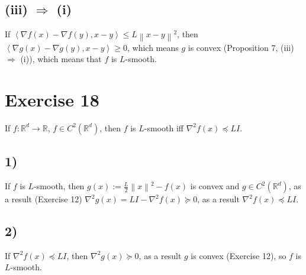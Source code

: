 \documentclass[11pt,a4paper]{article}
\newcommand{\R}{\mathbb{R}}
\newcommand{\norm}[1]{\left\| #1 \right\|}
\newcommand{\ip}[2]{\left\langle #1, #2 \right\rangle}
\begin{document}
\subsection*{(iii) $\Rightarrow$ (i)}
If $\ip{\nabla f(x) - \nabla f(y)}{x-y} \le L\norm{x-y}^2$, then
$\ip{\nabla g(x) - \nabla g(y)}{x-y} \ge 0$, which means $g$ is convex
(Proposition 7, (iii) $\Rightarrow$ (i)), which means that $f$ is $L$-smooth.

\section*{Exercise 18}

If $f : \R^d \to \R$, $f \in C^2(\R^d)$, then $f$ is $L$-smooth iff $\nabla^2 f(x) \preceq LI$.

\subsection*{1)}
If $f$ is $L$-smooth, then $g(x) := \frac{L}{2}\norm{x}^2 - f(x)$ is convex and
$g \in C^2(\R^d)$, as a result (Exercise 12) $\nabla^2 g(x) = LI - \nabla^2 f(x) \succeq 0$,
as a result $\nabla^2 f(x) \preceq LI$.

\subsection*{2)}
If $\nabla^2 f(x) \preceq LI$, then $\nabla^2 g(x) \succeq 0$, as a result $g$ is convex
(Exercise 12), so $f$ is $L$-smooth.
\end{document}
